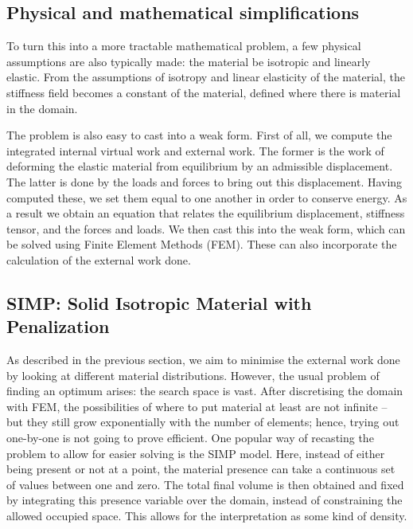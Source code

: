 \subsection{Physical and mathematical simplifications}
To turn this into a more tractable mathematical problem, a few physical assumptions are also typically made: the material be isotropic and linearly elastic. From the assumptions of isotropy and linear elasticity of the material, the stiffness field becomes a constant of the material, defined where there is material in the domain.

The problem is also easy to cast into a weak form. First of all, we compute the integrated internal virtual work and external work. The former is the work of deforming the elastic material from equilibrium by an admissible displacement. The latter is done by the loads and forces to bring out this displacement. Having computed these, we set them equal to one another in order to conserve energy. As a result we obtain an equation that relates the equilibrium displacement, stiffness tensor, and the forces and loads. We then cast this into the weak form, which can be solved using Finite Element Methods (FEM). These can also incorporate the calculation of the external work done.

\subsection{SIMP: Solid Isotropic Material with Penalization}

As described in the previous section, we aim to minimise the external work done by looking at different material distributions. However, the usual problem of finding an optimum arises: the search space is vast. After discretising the domain with FEM, the possibilities of where to put material at least are not infinite -- but they still grow exponentially with the number of elements; hence, trying out one-by-one is not going to prove efficient. One popular way of recasting the problem to allow for easier solving is the SIMP model. Here, instead of either being present or not at a point, the material presence can take a continuous set of values between one and zero. The total final volume is then obtained and fixed by integrating this presence variable over the domain, instead of constraining the allowed occupied space. This allows for the interpretation as some kind of density.

